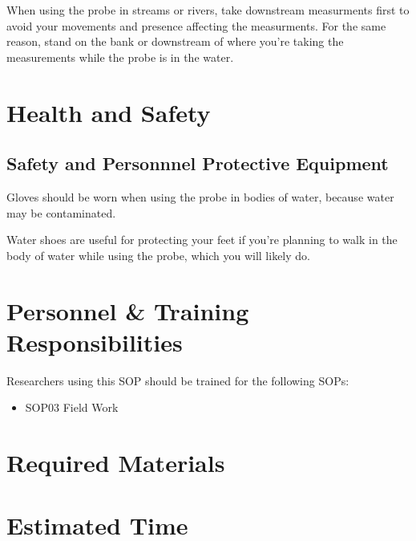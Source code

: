 \documentclass[12pt]{../SOP3_beta}\usepackage[]{graphicx}\usepackage[]{color}
\begin{document}
\NP When using the probe in streams or rivers, take downstream measurments first to avoid your movements and presence affecting the measurments. For the same reason, stand on the bank or downstream of where you're taking the measurements while the probe is in the water.  

\section{Health and Safety}

\subsection{Safety and Personnnel Protective Equipment}

\NP Gloves should be worn when using the probe in bodies of water, because water may be contaminated. 

\NP Water shoes are useful for protecting your feet if you're planning to walk in the body of water while using the probe, which you will likely do. 

\section{Personnel \& Training Responsibilities}

Researchers using this SOP should be trained for the following SOPs:

\begin{itemize}
  \item SOP03 Field Work
\end{itemize}

\section{Required Materials}






\section{Estimated Time}
\end{document}
